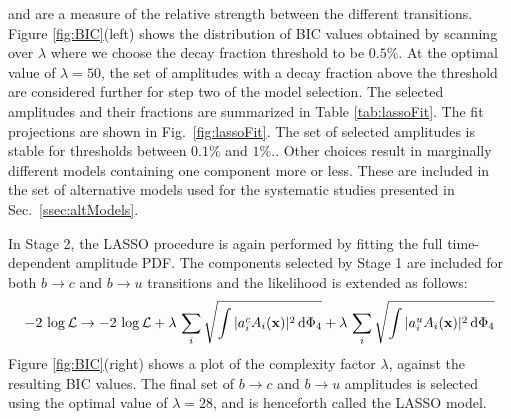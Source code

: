 and are a measure of the relative strength between the different transitions. 
Figure \ref{fig:BIC}(left) shows the distribution of BIC values obtained by scanning over $\lambda$
where we choose the decay fraction threshold to be $0.5 \%$.
At the optimal value of $\lambda=50$, the set of amplitudes with a decay fraction above the threshold 
are considered further for step two of the model selection.
The selected amplitudes and their fractions are summarized in Table \ref{tab:lassoFit}.
The fit projections are shown in Fig.~\ref{fig:lassoFit}.
The set of selected amplitudes is stable for thresholds between $0.1\%$ and $1\%.$. 
Other choices result in marginally different models containing one component more or less. These are included in the set of alternative models used for the systematic studies presented in Sec.~\ref{ssec:altModels}.

In Stage 2, the LASSO procedure is again performed by fitting the full time-dependent amplitude PDF.
The components selected by Stage 1 are included for both $b\to c$ and $b\to u$ transitions and the likelihood is extended as follows:
\begin{equation}
	-2 \, \log \mathcal L \rightarrow -2 \, \log \mathcal L + \lambda \, \sum_{i} \sqrt{ \int \vert a^{c}_i  A_i(\mathbf{x}) \vert^{2} \, \text{d}\Phi_{4}  }  + \lambda \, \sum_{i} \sqrt{ \int \vert a^{u}_i  A_i(\mathbf{x}) \vert^{2} \, \text{d}\Phi_{4}  } 
\end{equation}
Figure \ref{fig:BIC}(right) shows a plot of the complexity factor
$\lambda$, against the resulting BIC values. 
The final set of $b\to c$ and $b\to u$ amplitudes is selected using the optimal value of $\lambda=28$, and is henceforth called the LASSO model.

